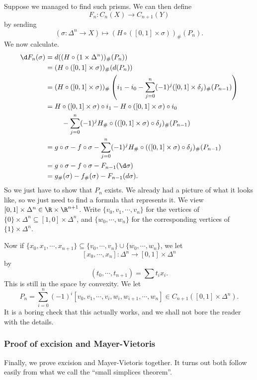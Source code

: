 \documentclass[a4paper]{article}
\begin{document}
Suppose we managed to find such prisms. We can then define
\[
  F_n: C_n(X) \to C_{n + 1}(Y)
\]
by sending
\[
  (\sigma: \Delta^n \to X) \mapsto (H \circ ([0, 1] \times \sigma))_\#(P_n).
\]
We now calculate.
\begin{align*}
  \d F_n(\sigma) ={}& d((H \circ (1 \times \Delta^n))_\#(P_n))\\
  ={}& (H \circ ([0, 1] \times \sigma))_\#(d(P_n))\\
  ={}& (H \circ ([0, 1] \times \sigma))_\# \left(i_1 - i_0 - \sum_{j = 0}^n (-1)^j ([0, 1] \times \delta_j)_\#(P_{n - 1})\right)\\
  ={}& H \circ ([0, 1] \times \sigma) \circ i_1 - H \circ ([0, 1] \times \sigma) \circ i_0 \\
  &\quad- \sum_{j = 0}^n (-1)^j H_\# \circ (([0, 1] \times \sigma) \circ \delta_j)_\# (P_{n - 1})\\
  ={}& g \circ \sigma - f \circ \sigma - \sum_{j = 0}^n (-1)^j H_\# \circ (([0, 1] \times \sigma) \circ \delta_j)_\# (P_{n - 1})\\
  ={}& g \circ \sigma - f \circ \sigma - F_{n - 1}(\d \sigma)\\
  ={}& g_\#(\sigma) - f_\#(\sigma) - F_{n - 1}(d\sigma).
\end{align*}
So we just have to show that $P_n$ exists. We already had a picture of what it looks like, so we just need to find a formula that represents it. We view $[0, 1] \times \Delta^n \in \R \times \R^{n + 1}$. Write $\{v_0, v_1, \cdots, v_n\}$ for the vertices of $\{0\} \times \Delta^n \subseteq [1, 0] \times \Delta^n$, and $\{w_0, \cdots, w_n\}$ for the corresponding vertices of $\{1\} \times \Delta^n$.

Now if $\{x_0, x_1, \cdots, x_{n + 1}\} \subseteq \{v_0, \cdots, v_n\} \cup \{w_0, \cdots, w_n\}$, we let
\[
  [x_0, \cdots, x_n]: \Delta^n \to [0, 1] \times \Delta^n
\]
by
\[
  (t_0, \cdots, t_{n + 1}) = \sum t_i x_i.
\]
This is still in the space by convexity. We let
\[
  P_n = \sum_{i = 0}^n (-1)^i [v_0, v_1 , \cdots, v_i, w_i, w_{i + 1}, \cdots, w_n] \in C_{n + 1}([0, 1] \times \Delta^n).
\]
It is a boring check that this actually works, and we shall not bore the reader with the details.

\subsubsection*{Proof of excision and Mayer-Vietoris}
Finally, we prove excision and Mayer-Vietoris together. It turns out both follow easily from what we call the ``small simplices theorem''.
\end{document}
